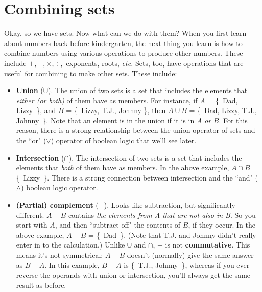 \section{Combining sets}

Okay, so we have sets. Now what can we do with them? When you first learn
about numbers back before kindergarten, the next thing you learn is how to
combine numbers using various operations to produce other numbers. These
include $+, -, \times, \div,$ exponents, roots, \textit{etc.} Sets, too,
have operations that are useful for combining to make other sets. These
include:

\begin{itemize}

\item \textbf{Union} ($\cup$).  The union of two
sets is a set that includes the elements that \textit{either (or both)} of
them have as members.  For instance, if $A$ = \{~Dad, Lizzy~\}, and $B$ =
\{~Lizzy, T.J., Johnny \}, then $A \cup B$ = \{~Dad, Lizzy, T.J.,
Johnny~\}. Note that an element is in the union if it is in $A$ \textit{or}
$B$. For this reason, there is a strong relationship between the union
operator of sets and the ``or" ($\vee$) operator of boolean logic that
we'll see later.

\item \textbf{Intersection} ($\cap$).  The
intersection of two sets is a set that includes the elements that
\textit{both} of them have as members. In the above example, $A \cap B$ =
\{~Lizzy~\}. There is a strong connection between intersection and the
``and" ($\wedge$) boolean logic operator.

\item \textbf{(Partial) complement} ($-$).  Looks like subtraction, but significantly different. $A - B$
contains \textit{the elements from A that are not also in B}. So you start
with $A$, and then ``subtract off" the contents of $B$, if they occur. In
the above example, $A-B$ = \{~Dad~\}.  (Note that T.J.  and Johnny didn't
really enter in to the calculation.) Unlike $\cup$ and $\cap$, $-$ is not
\textbf{commutative}.  This means it's not symmetrical:
$A-B$ doesn't (normally) give the same answer as $B-A$. In this example,
$B-A$ is \{~T.J., Johnny~\}, whereas if you ever reverse the operands with
union or intersection, you'll always get the same result as before.


\end{itemize}
